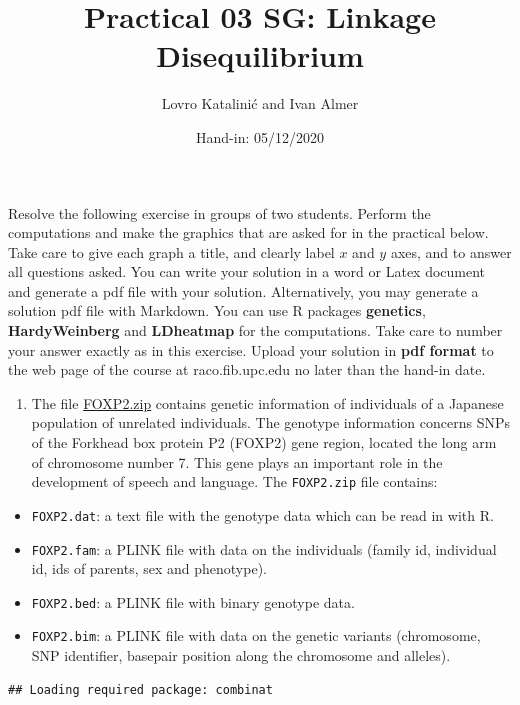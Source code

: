\documentclass[
]{article}
\title{Practical 03 SG: Linkage Disequilibrium}
\author{Lovro Katalinić and Ivan Almer}
\date{Hand-in: 05/12/2020}
\providecommand{\tightlist}{%
  \setlength{\itemsep}{0pt}\setlength{\parskip}{0pt}}
\begin{document}
\maketitle

Resolve the following exercise in groups of two students. Perform the
computations and make the graphics that are asked for in the practical
below. Take care to give each graph a title, and clearly label \(x\) and
\(y\) axes, and to answer all questions asked. You can write your
solution in a word or Latex document and generate a pdf file with your
solution. Alternatively, you may generate a solution pdf file with
Markdown. You can use R packages \textbf{genetics},
\textbf{HardyWeinberg} and \textbf{LDheatmap} for the computations. Take
care to number your answer exactly as in this exercise. Upload your
solution in \textbf{pdf format} to the web page of the course at
raco.fib.upc.edu no later than the hand-in date.

\begin{enumerate}
\def\labelenumi{\arabic{enumi}.}
\tightlist
\item
  The file
  \href{http://www-eio.upc.es/~jan/data/bsg/FOXP2.zip}{FOXP2.zip}
  contains genetic information of individuals of a Japanese population
  of unrelated individuals. The genotype information concerns SNPs of
  the Forkhead box protein P2 (FOXP2) gene region, located the long arm
  of chromosome number 7. This gene plays an important role in the
  development of speech and language. The \texttt{FOXP2.zip} file
  contains:
\end{enumerate}

\begin{itemize}
\item
  \texttt{FOXP2.dat}: a text file with the genotype data which can be
  read in with R.
\item
  \texttt{FOXP2.fam}: a PLINK file with data on the individuals (family
  id, individual id, ids of parents, sex and phenotype).
\item
  \texttt{FOXP2.bed}: a PLINK file with binary genotype data.
\item
  \texttt{FOXP2.bim}: a PLINK file with data on the genetic variants
  (chromosome, SNP identifier, basepair position along the chromosome
  and alleles).
\end{itemize}

\begin{verbatim}
## Loading required package: combinat
\end{verbatim}
\end{document}
